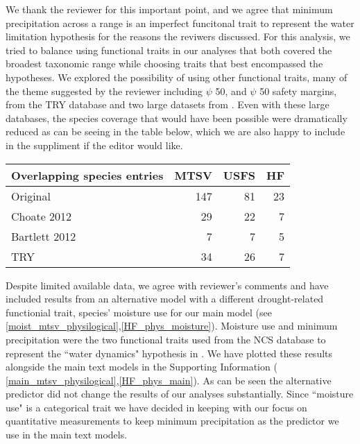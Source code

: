 \documentclass{article}[11pt]
\begin{document}
\noindent We thank the reviewer for this important point, and we agree that minimum precipitation across a range is an imperfect funcitonal trait to represent the water limitation hypothesis for the reasons the reviwers discussed. For this analysis, we tried to balance using functional traits in our analyses that both covered the broadest taxonomic range while choosing traits that best encompassed the hypotheses.  We explored the possibility of using other functional traits, many of the theme suggested by the reviewer including $\psi$ 50, and $\psi$ 50 safety margins, from the TRY database and two large datasets from \citet{Bartlett2012} \citet{Choat2012}. Even with these large databases, the species coverage that would have been possible were dramatically reduced as can be seeing in the table below, which we are also happy to include in the suppliment if the editor would like.\\

\begin{table}[ht]
\centering
\begin{tabular}{lrrr}
  \hline
  Overlapping species entries & MTSV & USFS & HF \\ 
  \hline
 Original & 147 &  81 &  23 \\ 
 Choate 2012 &  29 &  22 &   7 \\ 
 Bartlett 2012 &   7 &   7 &   5 \\ 
 TRY &  34 &  26 &   7 \\ 
   \hline
\end{tabular}
\end{table}

\noindent Despite limited available data, we agree with reviewer's comments and have included results from an alternative model with a different drought-related functionial trait, species' moisture use for our main model (see \ref{moist_mtsv_physilogical},\ref{HF_phys_moisture}). Moisture use and minimum precipitation were the two functional traits used from the NCS database to represent the ``water dynamics" hypothesis in \citet{Gougherty2018}. We have plotted these results alongside the main text models in the Supporting Information ( \ref{main_mtsv_physilogical},\ref{HF_phys_main}). As can be seen the alternative predictor did not change the results of our analyses substantially. Since ``moisture use" is a categorical trait we have decided in keeping with our focus on quantitative measurements to keep minimum precipitation as the predictor we use in the main text models.  \\
\end{document}
